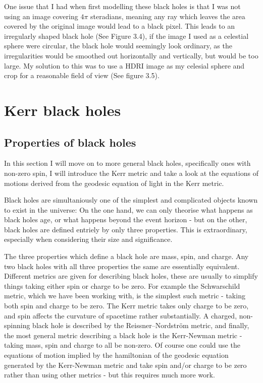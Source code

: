 \documentclass[oneside,openright,frontopenright]{dmathesis}
\begin{document}
	One issue that I had when first modelling these black holes is that I was not using an image covering $4\pi$ steradians, meaning any ray which leaves the area covered by the original image would lead to a black pixel. This leads to an irregularly shaped black hole (See Figure 3.4), if the image I used as a celestial sphere were circular, the black hole would seemingly look ordinary, as the irregularities would be smoothed out horizontally and vertically, but would be too large. My solution to this was to use a HDRI image as my celesial sphere and crop for a reasonable field of view (See figure 3.5).


\chapter{Kerr black holes}
\section{Properties of black holes}

	In this section I will move on to more general black holes, specifically ones with non-zero spin, I will introduce the Kerr metric and take a look at the equations of motions derived from the geodesic equation of light in the Kerr metric.

	Black holes are simultaniously one of the simplest and complicated objects known to exist in the universe: On the one hand, we can only theorise what happens as black holes age, or what happens beyond the event horizon - but on the other, black holes are defined entriely by only three properties. This is extraordinary, especially when considering their size and significance.

	The three properties which define a black hole are mass, spin, and charge. Any two black holes with all three properties the same are essentially equivalent. Different metrics are given for describing black holes, these are usually to simplify things taking either spin or charge to be zero. For example the Schwarschild metric, which we have been working with, is the simplest such metric - taking both spin and charge to be zero. The Kerr metric takes only charge to be zero, and spin affects the curvature of spacetime rather substantially. A charged, non-spinning black hole is described by the Reissner–Nordström metric, and finally, the most general metric describing a black hole is the Kerr-Newman metric - taking mass, spin and charge to all be non-zero. Of course one could use the equations of motion implied by the hamiltonian of the geodesic equation generated by the Kerr-Newman metric and take spin and/or charge to be zero rather than using other metrics - but this requires much more work.
\end{document}
